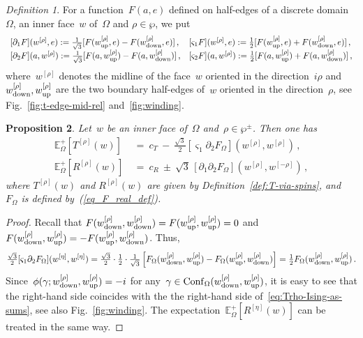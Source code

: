 \documentclass[reqno,11pt,a4paper]{amsart}
\newtheorem{proposition}{Proposition}[section]
\theoremstyle{remark}
\newtheorem{definition}[proposition]{Definition}
\newcommand{\CmT}{c_T}
\newcommand{\CmR}{c_R}
\newcommand{\Reta}{R^{[\eta]}}
\newcommand{\Trho}{T^{[\rho]}}
\newcommand{\Rrho}{R^{[\rho]}}
\newcommand{\E}{\mathbb{E}_\Omega}
\newcommand{\weta}{w^{\left[\eta \right]}}
\newcommand{\wrho}{w^{\left[\rho \right]}}
\newcommand{\wmrho}{w^{\left[-\rho \right]}}
\newcommand{\wup}{\weta_{\vphantom{\mathrm{d}}\mathrm{up}}}
\renewcommand{\wup}{\wrho_{\vphantom{\mathrm{d}}\mathrm{up}}}
\newcommand{\wdown}{\weta_{\mathrm{down}}}
\renewcommand{\wdown}{\wrho_{\mathrm{down}}}
\newcommand{\phase}{\phi}
\newcommand{\F}{F_\Omega}       \newcommand{\Fdelta}{F_{\Omega_\delta}}
\newcommand{\conf}{\mathrm{Conf}}
\newcommand{\dOne}{\partial_1}
\newcommand{\dTwo}{\partial_2}
\newcommand{\sOne}{\varsigma_1}
\newcommand{\sTwo}{\varsigma_2}
\newcommand\ConfO[1]{\conf_\Omega(#1)}
\begin{document}
\begin{definition}
\label{def:discrete-derivatives}
For a function~$F(a,e)$ defined on half-edges of a discrete domain~$\Omega$, an inner face~$w$ of~$\Omega$ and $\rho\in\wp$,
we put
\[
\begin{array}{ll}
[\dOne F](\wrho,e):=\frac{1}{\sqrt{3}} [ F(\wup,e) - F(\wdown,e) ]\,,& [\sOne F](\wrho,e) := \frac{1}{2} [ F(\wup,e) + F(\wdown,e) ]\,, \\{}
[\dTwo F](a,\wrho):=\frac{1}{\sqrt{3}} [ F(a,\wup) - F(a,\wdown) ]\,,& [\sTwo F](a,\wrho) := \frac{1}{2} [ F(a,\wup) + F(a,\wdown) ]\,,
\end{array}
\]
where~$\wrho$ denotes the midline of the face~$w$ oriented in the direction~$i\rho$ and $\wdown,\wup$ are the two boundary half-edges of~$w$ oriented in the direction~$\rho$, see Fig.~\ref{fig:t-edge-mid-rel} and~\ref{fig:winding}.
\end{definition}

\begin{proposition} \label{prop_via_fermion_t}
Let~$w$ be an inner face of~$\Omega$ { and~$\rho\in\wp^\pm$}.
Then one has
\begin{align*}
\E^+[\Trho(w)] &~=~ \CmT~{-}~{\textstyle\frac{\sqrt{3}}{2}}[\sOne\dTwo\F](\wrho,\wrho)\,,\\
\E^+[\Rrho(w)] &~=~ \CmR~{\pm}~{\sqrt{3}}\,[\dOne\dTwo\F](\wrho,\wmrho)\,,
\end{align*}
where
$\Trho(w)$ and $\Rrho(w)$ are given by Definition~\ref{def:T-via-spins}, and~$\F$ is defined by~(\ref{eq_F_real_def}).
\end{proposition}

\begin{proof}
Recall that $F(\wdown,\wdown)=F(\wup,\wup)=0$ and~$F(\wdown,\wup)=-F(\wup,\wdown)$.
Thus,
\begin{align*}
{\textstyle\frac{\sqrt{3}}{2}}[\sOne\dTwo\F](\weta,\weta) =
{\textstyle\frac{\sqrt{3}}{2}}\cdot\tfrac{1}{2}\cdot {\textstyle\frac{1}{\sqrt{3}}}
\left[
\F(\wdown, \wup) - \F(\wup, \wdown)
\right] = \tfrac{1}{2}\F(\wdown, \wup)\,.
\end{align*}
Since~$\phase(\gamma;\wdown,\wup) = -i$ for any~$\gamma\in \ConfO{\wdown, \wup}$, it is easy to see that the right-hand side coincides with the the right-hand side of~\eqref{eq:Trho-Ising-as-sums}, see also Fig.~\ref{fig:winding}.
The expectation~$\E^+[\Reta(w)]$ can be treated in the same way.
\end{proof}
\end{document}
